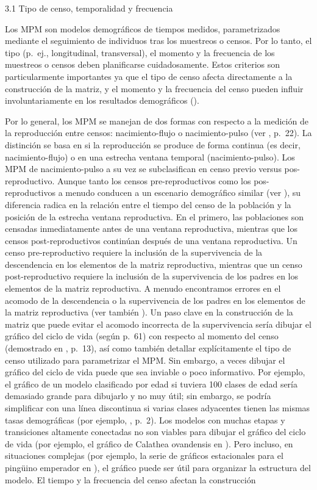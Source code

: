 \documentclass[
]{book}
\theoremstyle{definition}
\theoremstyle{definition}
\theoremstyle{definition}
\theoremstyle{definition}
\theoremstyle{remark}
\begin{document}
3.1 \textbar{} Tipo de censo, temporalidad y frecuencia

Los MPM son modelos demográficos de tiempos medidos, parametrizados mediante el seguimiento de individuos tras los muestreos o censos. Por lo tanto, el tipo (p.~ej., longitudinal, transversal), el momento y la frecuencia de los muestreos o censos deben planificarse cuidadosamente. Estos criterios son particularmente importantes ya que el tipo de censo afecta directamente a la construcción de la matriz, y el momento y la frecuencia del censo pueden influir involuntariamente en los resultados demográficos (\citet{emery2005effects}).

Por lo general, los MPM se manejan de dos formas con respecto a la medición de la reproducción entre censos: nacimiento-flujo o nacimiento-pulso (ver \citet{caswell2001matrix}, p.~22). La distinción se basa en si la reproducción se produce de forma continua (es decir, nacimiento-flujo) o en una estrecha ventana temporal (nacimiento-pulso). Los MPM de nacimiento-pulso a su vez se subclasifican en censo previo versus pos-reproductivo. Aunque tanto los censos pre-reproductivos como los pos-reproductivos a menudo conducen a un escenario demográfico similar (ver \citet{cooch2003apparent}), su diferencia radica en la relación entre el tiempo del censo de la población y la posición de la estrecha ventana reproductiva. En el primero, las poblaciones son censadas inmediatamente antes de una ventana reproductiva, mientras que los censos post-reproductivos continúan después de una ventana reproductiva. Un censo pre-reproductivo requiere la inclusión de la supervivencia de la descendencia en los elementos de la matriz reproductiva, mientras que un censo post-reproductivo requiere la inclusión de la supervivencia de los padres en los elementos de la matriz reproductiva. A menudo encontramos errores en el acomodo de la descendencia o la supervivencia de los padres en los elementos de la matriz reproductiva (ver también \citet{kendall2019persistent}). Un paso clave en la construcción de la matriz que puede evitar el acomodo incorrecta de la supervivencia sería dibujar el gráfico del ciclo de vida (según \citet{ebertbookplant} p.~61) con respecto al momento del censo (demostrado en \citet{ellner2016data}, p.~13), así como también detallar explícitamente el tipo de censo utilizado para parametrizar el MPM. Sin embargo, a veces dibujar el gráfico del ciclo de vida puede que sea inviable o poco informativo. Por ejemplo, el gráfico de un modelo clasificado por edad si tuviera 100 clases de edad sería demasiado grande para dibujarlo y no muy útil; sin embargo, se podría simplificar con una línea discontinua si varias clases adyacentes tienen las mismas tasas demográficas (por ejemplo, \citet{ebertbookplant}, p.~2). Los modelos con muchas etapas y transiciones altamente conectadas no son viables para dibujar el gráfico del ciclo de vida (por ejemplo, el gráfico de Calathea ovandensis en \citet{neubert2000demography}). Pero incluso, en situaciones complejas (por ejemplo, la serie de gráficos estacionales para el pingüino emperador en \citet{jenouvrier2010mating}), el gráfico puede ser útil para organizar la estructura del modelo. El tiempo y la frecuencia del censo afectan la construcción 
\end{document}
